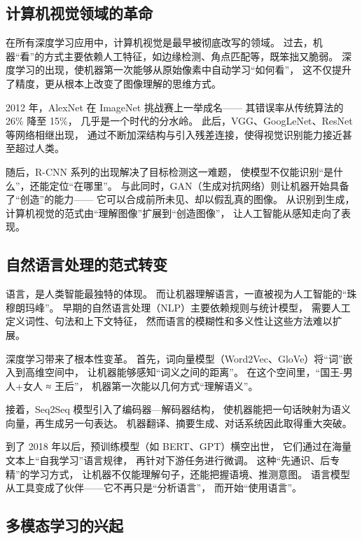 \subsection{计算机视觉领域的革命}

在所有深度学习应用中，计算机视觉是最早被彻底改写的领域。  
过去，机器“看”的方式主要依赖人工特征，如边缘检测、角点匹配等，既笨拙又脆弱。  
深度学习的出现，使机器第一次能够从原始像素中自动学习“如何看”，  
这不仅提升了精度，更从根本上改变了图像理解的思维方式。  

2012 年，AlexNet 在 ImageNet 挑战赛上一举成名——  
其错误率从传统算法的 26\% 降至 15\%，  
几乎是一个时代的分水岭。  
此后，VGG、GoogLeNet、ResNet 等网络相继出现，  
通过不断加深结构与引入残差连接，使得视觉识别能力接近甚至超过人类。  

随后，R-CNN 系列的出现解决了目标检测这一难题，  
使模型不仅能识别“是什么”，还能定位“在哪里”。  
与此同时，GAN（生成对抗网络）则让机器开始具备了“创造”的能力——  
它可以合成前所未见、却以假乱真的图像。  
从识别到生成，计算机视觉的范式由“理解图像”扩展到“创造图像”，  
让人工智能从感知走向了表现。


\subsection{自然语言处理的范式转变}

语言，是人类智能最独特的体现。  
而让机器理解语言，一直被视为人工智能的“珠穆朗玛峰”。  
早期的自然语言处理（NLP）主要依赖规则与统计模型，  
需要人工定义词性、句法和上下文特征，  
然而语言的模糊性和多义性让这些方法难以扩展。  

深度学习带来了根本性变革。  
首先，词向量模型（Word2Vec、GloVe）将“词”嵌入到高维空间中，  
让机器能够感知“词义之间的距离”。  
在这个空间里，“国王-男人+女人 ≈ 王后”，  
机器第一次能以几何方式“理解语义”。  

接着，Seq2Seq 模型引入了编码器—解码器结构，  
使机器能把一句话映射为语义向量，再生成另一句表达。  
机器翻译、摘要生成、对话系统因此取得重大突破。  

到了 2018 年以后，预训练模型（如 BERT、GPT）横空出世，  
它们通过在海量文本上“自我学习”语言规律，  
再针对下游任务进行微调。  
这种“先通识、后专精”的学习方式，  
让机器不仅能理解句子，还能把握语境、推测意图。  
语言模型从工具变成了伙伴——它不再只是“分析语言”，  
而开始“使用语言”。


\subsection{多模态学习的兴起}


